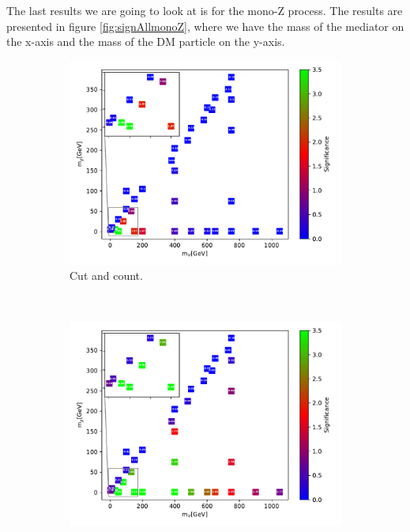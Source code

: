The last results we are going to look at is for the mono-Z process. The results are presented in figure \ref{fig:signAllmonoZ}, where we have the mass of the mediator on the x-axis and the mass of the DM particle on the y-axis. 

\begin{figure}[H]
    \centering
    \begin{subfigure}[t!]{0.49\textwidth}
    \includegraphics[width = \textwidth]{Figures/Significances/significanceCutandCount_monoZ_all.pdf}
    \caption{Cut and count.}
        \label{fig:signAllmonoZcandc}
    \end{subfigure}
    \\
    \begin{subfigure}[t!]{0.49\textwidth}
    \includegraphics[width = \textwidth]{Figures/Significances/significance_BDT_monoZ_All_level.pdf}

\end{subfigure}
\end{figure}
